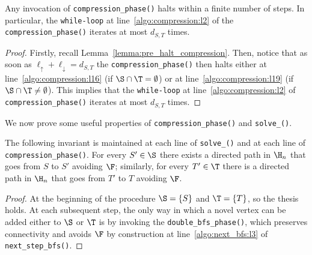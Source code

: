 \begin{lemma}\label{lemma:halt_compression}
Any invocation of \texttt{compression\_phase()} halts within a finite number of steps.
In particular, the \texttt{while-loop} at line~\ref{algo:compression:l2}
of the \texttt{compression\_phase()} iterates at most $d_{S,T}$ times.
\end{lemma}
\begin{proof}
Firstly, recall Lemma~\ref{lemma:pre_halt_compression}.
Then, notice that as soon as $\ell_\uparrow + \ell_\downarrow=d_{S,T}$
the \texttt{compression\_phase()}
then halts either at line~\ref{algo:compression:l16} (if $\S\cap\T=\emptyset$)
or at line~\ref{algo:compression:l19} (if $\S\cap\T\neq\emptyset$).
This implies that the \texttt{while-loop} at
line~\ref{algo:compression:l2} of \texttt{compression\_phase()}
iterates at most $d_{S,T}$ times.
\end{proof}

We now prove some useful properties of \texttt{compression\_phase()} and \texttt{solve\_\mainproblem()}.

\begin{lemma}\label{lemma:reconstruct_path}
The following invariant is maintained at each line of \texttt{solve\_\mainproblem()}
and at each line of \texttt{compression\_phase()}.
For every $S'\in\S$ there exists a directed path in $\H_n$ that goes from $S$ to $S'$ avoiding $\F$;
similarly, for every $T'\in\T$ there is a directed path in $\H_n$ that goes from $T'$ to $T$ avoiding $\F$.
\end{lemma}
\begin{proof}
At the beginning of the procedure $\S=\{S\}$ and $\T=\{T\}$, so the thesis holds.
At each subsequent step, the only way in which a novel vertex can be added either to $\S$ or $\T$
is by invoking the \texttt{double\_bfs\_phase()},
which preserves connectivity and avoids $\F$ by construction at line~\ref{algo:next_bfs:l3} of \texttt{next\_step\_bfs()}.
\end{proof}

